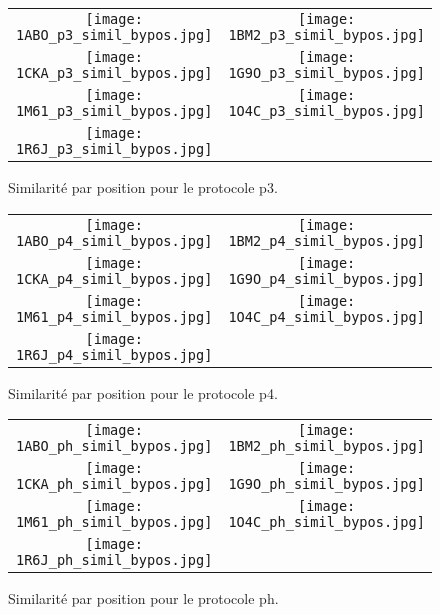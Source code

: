    \begin{figure}[t]
     \centering
     \begin{tabular}{cc}
       \texttt{[image: 1ABO\_p3\_simil\_bypos.jpg]}  &
       \texttt{[image: 1BM2\_p3\_simil\_bypos.jpg]} \\
       \texttt{[image: 1CKA\_p3\_simil\_bypos.jpg]} &
       \texttt{[image: 1G9O\_p3\_simil\_bypos.jpg]} \\
       \texttt{[image: 1M61\_p3\_simil\_bypos.jpg]} &
       \texttt{[image: 1O4C\_p3\_simil\_bypos.jpg]} \\
       \texttt{[image: 1R6J\_p3\_simil\_bypos.jpg]} \\
     \end{tabular}
     
     \caption{Similarité par position pour le protocole p3.}
     \label{Sim_pos_byp3}
   \end{figure}
   \begin{figure}[t]
     \centering
     \begin{tabular}{cc}
       \texttt{[image: 1ABO\_p4\_simil\_bypos.jpg]} &
       \texttt{[image: 1BM2\_p4\_simil\_bypos.jpg]} \\
       \texttt{[image: 1CKA\_p4\_simil\_bypos.jpg]} &
       \texttt{[image: 1G9O\_p4\_simil\_bypos.jpg]} \\
       \texttt{[image: 1M61\_p4\_simil\_bypos.jpg]} &
       \texttt{[image: 1O4C\_p4\_simil\_bypos.jpg]} \\
       \texttt{[image: 1R6J\_p4\_simil\_bypos.jpg]} \\
     \end{tabular}
     
     \caption{Similarité par position pour le protocole p4.}
     \label{Sim_pos_byp4}
   \end{figure}
   \begin{figure}[t]
     \centering
     \begin{tabular}{cc}
       \texttt{[image: 1ABO\_ph\_simil\_bypos.jpg]} &
       \texttt{[image: 1BM2\_ph\_simil\_bypos.jpg]} \\
       \texttt{[image: 1CKA\_ph\_simil\_bypos.jpg]} &
       \texttt{[image: 1G9O\_ph\_simil\_bypos.jpg]} \\
       \texttt{[image: 1M61\_ph\_simil\_bypos.jpg]} &
       \texttt{[image: 1O4C\_ph\_simil\_bypos.jpg]} \\
       \texttt{[image: 1R6J\_ph\_simil\_bypos.jpg]} \\
     \end{tabular}
     
     \caption{Similarité par position pour le protocole ph.}
     \label{Sim_pos_byph}
   \end{figure}



